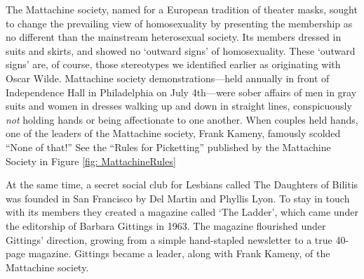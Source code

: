 The Mattachine society, named for a European tradition of theater masks, sought to change the prevailing view of homosexuality by presenting the membership as no different than the mainstream heterosexual society. Its members dressed in suits and skirts, and showed no `outward signs' of homosexuality. These `outward signs' are, of course, those stereotypes we identified earlier as originating with Oscar Wilde. Mattachine society demonstrations---held annually in front of Independence Hall in Philadelphia on July 4th---were sober affairs of men in gray suits and women in dresses walking up and down in straight lines, conspicuously \emph{not} holding hands or being affectionate to one another. When couples held hands, one of the leaders of the Mattachine society, Frank Kameny, famously scolded ``None of that!'' See the ``Rules for Picketting'' published by the Mattachine Society in Figure \ref{fig: MattachineRules}

At the same time, a secret social club for Lesbians called The Daughters of Bilitis was founded in San Francisco by Del Martin and Phyllis Lyon. To stay in touch with its members they created a magazine called `The Ladder', which came under the editorship of Barbara Gittings in 1963. The magazine flourished under Gittings' direction, growing from a simple hand-stapled newsletter to a true 40-page magazine. Gittings became a leader, along with Frank Kameny, of the Mattachine society.


